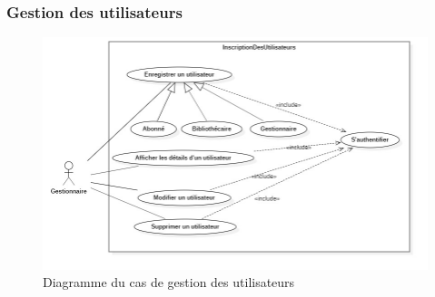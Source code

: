 \subsubsection{Gestion des utilisateurs} 
\begin{figure}[h]
        \centering
        \includegraphics[width=1\textwidth]{gestionDesUtilisateursUseCase}
        \caption{Diagramme du cas de gestion des utilisateurs}
        \label{image-gestionDesUtilisateursUseCase}
        \end{figure}
